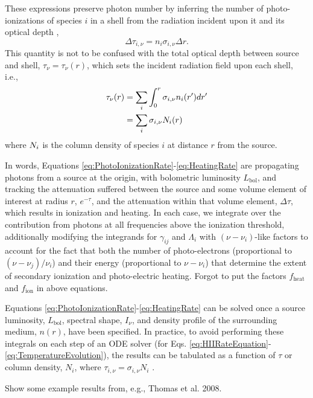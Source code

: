 These expressions preserve photon number by inferring the number of photo-ionizations of species $i$ in a shell from the radiation incident upon it and its optical depth \cite{Abel1999},
\begin{equation}
    \Delta \tau_{i,\nu} = n_i \sigma_{i,\nu} \Delta r .
\end{equation}    
This quantity is not to be confused with the total optical depth between source and shell, $\tau_{\nu} = \tau_{\nu}(r)$, which sets the incident radiation field upon each shell, i.e.,
\begin{align}
    \tau_{\nu}(r) & = \sum_i \int_0^r \sigma_{i,\nu} n_i(r^{\prime}) dr^{\prime} \nonumber \\
                  & = \sum_i \sigma_{i,\nu} N_i(r) \label{eq:OpticalDepth}
\end{align}
where $N_i$ is the column density of species $i$ at distance $r$ from the
source. 

In words, Equations \ref{eq:PhotoIonizationRate}-\ref{eq:HeatingRate} are propagating photons from a source at the origin, with bolometric luminosity $L_{\mathrm{bol}}$, and tracking the attenuation suffered between the source and some volume element of interest at radius $r$, $e^{-\tau}$, and the attenuation within that volume element, $\Delta \tau$, which results in ionization and heating. In each case, we integrate over the contribution from photons at all frequencies above the ionization threshold, additionally modifying the integrands for $\gamma_{ij}$ and $\Lambda_i$ with $(\nu - \nu_i)$-like factors to account for the fact that both the number of photo-electrons (proportional to $(\nu - \nu_j) / \nu_i$) and their energy (proportional to $\nu - \nu_i$) that determine the extent of secondary ionization and photo-electric heating. {\color{red} Forgot to put the factors $f_{\mathrm{heat}}$ and $f_{\mathrm{ion}}$ in above equations.}

Equations \ref{eq:PhotoIonizationRate}-\ref{eq:HeatingRate} can be solved once a source luminosity, $L_{\mathrm{bol}}$, spectral shape, $I_{\nu}$, and density profile of the surrounding medium, $n(r)$, have been specified. In practice, to avoid performing these integrals on each step of an ODE solver (for Eqs. \ref{eq:HIIRateEquation}-\ref{eq:TemperatureEvolution}), the results can be tabulated as a function of $\tau$ or column density, $N_i$, where $\tau_{i,\nu}=\sigma_{i,\nu} N_i$ \cite{Thomas2008,Mirocha2012}.

{\color{red} Show some example results from, e.g., Thomas et al. 2008.}

